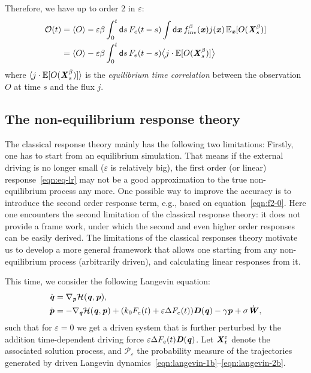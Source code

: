 \documentclass[aip,jcp,a4paper,reprint,onecolumn]{revtex4-1}
\newcommand{\vect}[1]{\textbf{\textit{#1}}}
\newcommand{\dd}{\textsf{d}}
\newcommand{\inv}{\textrm{inv}}
\newcommand{\mh}{\mathcal H}
\newcommand{\eps}{\varepsilon}
\newcommand{\ml}{\mathcal L}
\begin{document}
Therefore, we have up to order 2 in $\eps$:
\begin{align}\nonumber
  \mathcal O(t)
 & =
  \langle O\rangle
  -
  \eps\beta
  \int_0^t\dd s\,
  F_e(t-s)
  \int \dd \vect x\,
  f^\beta_{\inv}(\vect x)
  j(\vect x)\,
  \mathbb E_{\vect x} [O(\vect X^\beta_s)]\\
\label{eqn:eq-lr}  
 & =
  \langle O\rangle
  -
  \eps \beta
  \int_0^t\dd s\,
  F_e(t-s)
  \big\langle
  j\cdot
  \mathbb E [O(\vect X^\beta_s)]
  \big\rangle
\end{align}
where $  \langle
  j\cdot
  \mathbb E [O(\vect X^\beta_s)]
  \rangle$ is the \emph{equilibrium time
  correlation} between the observation $O$ at time $s$ and the flux $j$.


\subsection{The non-equilibrium response theory}

The classical response theory mainly has the following two limitations:
Firstly, one has to start from an equilibrium simulation. That means if the
external driving is no longer small ($\eps$ is relatively big), the
first order (or linear) response~\eqref{eqn:eq-lr} may not be a good approximation to
the true non-equilibrium process any more.
One possible way to improve the accuracy is to introduce the second
order response term, e.g., based on equation~\eqref{eqn:f2-0}.
Here one encounters the second limitation of the classical
response theory: it does not provide a frame work, under which
the second and even higher order responses can be easily derived.
The limitations of the classical responses theory motivate us to
develop a more general framework that allows one starting from any
non-equilibrium process (arbitrarily driven), and calculating linear responses from it.

This time, we consider the following Langevin equation:
\begin{align}\label{eqn:langevin-1b}
  \dot{\vect q} & = \nabla_{\vect p}\mh(\vect q,\vect p), \\\label{eqn:langevin-2b}
  \dot{\vect p} & =- \nabla_{\vect q}\mh(\vect q,\vect p)
  + (k_0 F_e(t)+\eps \Delta F_e(t)) \vect D(\vect q)
  - \gamma\vect p
  + \sigma\dot{\vect W},
\end{align}
such that for $\eps=0$ we get a driven system that is further
perturbed by the addition time-dependent driving force $\eps \Delta
F_e(t) \vect D(\vect q)$. Let $\vect X^\eps_t$ denote the associated solution process, and
$\mathcal P_\eps$ the probability measure of the trajectories
generated by driven Langevin
dynamics~\eqref{eqn:langevin-1b}--\eqref{eqn:langevin-2b}.
\end{document}
